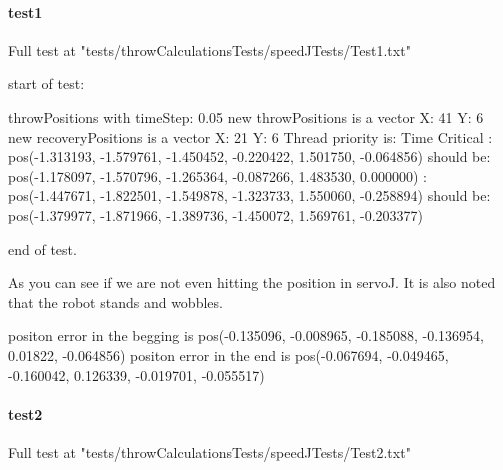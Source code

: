 \paragraph{test1}
Full test at "tests/throwCalculationsTests/speedJTests/Test1.txt"\newline

start of test:\newline

throwPositions with timeStep:  0.05
\newline new throwPositions is a vector X: 41 Y:  6
\newline new recoveryPositions is a vector X: 21 Y:  6
\newline Thread priority is: Time Critical
\newline [0.000000s - Step 0/41]:
\newline \hspace{1cm}        pos(-1.313193, -1.579761, -1.450452, -0.220422, 1.501750, -0.064856) should be:
\newline \hspace{1cm}        pos(-1.178097, -1.570796, -1.265364, -0.087266, 1.483530, 0.000000)
\newline [2.000000s - Step 40/41]:
\newline \hspace{1cm}        pos(-1.447671, -1.822501, -1.549878, -1.323733, 1.550060, -0.258894) should be:
\newline \hspace{1cm}        pos(-1.379977, -1.871966, -1.389736, -1.450072, 1.569761, -0.203377)\newline

end of test.\newline

As you can see if we are not even hitting the position in servoJ. It is also noted that the robot stands and wobbles.\newline

positon error in the begging is pos(-0.135096, -0.008965, -0.185088, -0.136954, 0.01822, -0.064856)
\newline positon error in the end is pos(-0.067694, -0.049465, -0.160042, 0.126339, -0.019701, -0.055517)\newline 

\paragraph{test2}
Full test at "tests/throwCalculationsTests/speedJTests/Test2.txt"\newline

